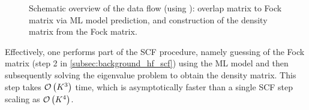 \begin{figure}[H]
    \caption[Schematic overview data flow]{Schematic overview of the data flow (using ): overlap matrix to Fock matrix via ML model prediction, and construction of the density matrix from the Fock matrix.}
    \label{fig:method_data_flow}
\end{figure}
Effectively, one performs part of the SCF procedure, namely guessing of the Fock matrix (step 2 in \autoref{subsec:background_hf_scf}) using the ML model and then subsequently solving the eigenvalue problem to obtain the density matrix. This step takes $\mathcal{O}\left(K^3\right)$ time, which is asymptotically faster than a single SCF step scaling as $\mathcal{O}\left(K^4\right)$. 

